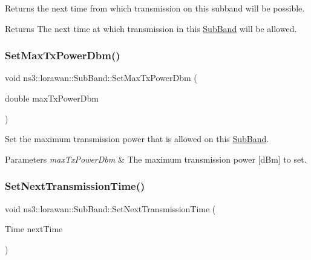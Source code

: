 Returns the next time from which transmission on this subband will be possible.

\begin{DoxyReturn}{Returns}
The next time at which transmission in this \hyperlink{classns3_1_1lorawan_1_1SubBand}{Sub\+Band} will be allowed. 
\end{DoxyReturn}
\mbox{\label{classns3_1_1lorawan_1_1SubBand_ae7d62f0bfad6a386b1d7036da38d82b7}} 
\subsubsection{\texorpdfstring{Set\+Max\+Tx\+Power\+Dbm()}{SetMaxTxPowerDbm()}}
{\footnotesize\ttfamily void ns3\+::lorawan\+::\+Sub\+Band\+::\+Set\+Max\+Tx\+Power\+Dbm (\begin{DoxyParamCaption}\item[{double}]{max\+Tx\+Power\+Dbm }\end{DoxyParamCaption})}

Set the maximum transmission power that is allowed on this \hyperlink{classns3_1_1lorawan_1_1SubBand}{Sub\+Band}.


\begin{DoxyParams}{Parameters}
{\em max\+Tx\+Power\+Dbm} & The maximum transmission power \mbox{[}d\+Bm\mbox{]} to set. \\
\hline
\end{DoxyParams}
\mbox{\label{classns3_1_1lorawan_1_1SubBand_a5868e39cf48f0a104003cba5c383d6fa}} 
\subsubsection{\texorpdfstring{Set\+Next\+Transmission\+Time()}{SetNextTransmissionTime()}}
{\footnotesize\ttfamily void ns3\+::lorawan\+::\+Sub\+Band\+::\+Set\+Next\+Transmission\+Time (\begin{DoxyParamCaption}\item[{Time}]{next\+Time }\end{DoxyParamCaption})}

